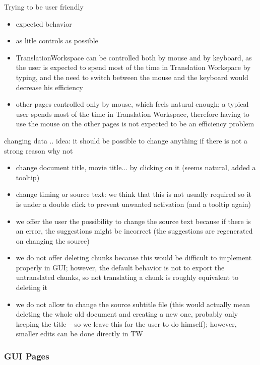 {Trying to be user friendly

\begin{itemize}
\item expected behavior
\item as litle controls as possible
\item TranslationWorkspace can be controlled both by mouse and by keyboard, as the user is expected to spend most of the time in Translation Workspace by typing, and the need to switch between the mouse and the keyboard would decrease his efficiency
\item other pages controlled only by mouse, which feels natural enough; a typical user spends most of the time in Translation Workspace, therefore having to use the mouse on the other pages is not expected to be an efficiency problem
\end{itemize}

changing data .. idea: it should be possible to change anything if there is not a strong reason why not
\begin{itemize}
\item change document title, movie title... by clicking on it (seems natural, added a tooltip)

\item change timing or source text: we think that this is not usually required so it is under a double click to prevent unwanted activation (and a tooltip again)

\item we offer the user the possibility to change the source text because if there is an error, the suggestions might be incorrect (the suggestions are regenerated on changing the source)

\item we do not offer deleting chunks because this would be difficult to implement properly in GUI; however, the default behavior is not to export the untranslated chunks, so not translating a chunk is roughly equivalent to deleting it

\item we do not allow to change the source subtitle file (this would actually mean deleting the whole old document and creating a new one, probably only keeping the title -- so we leave this for the user to do himself); however, smaller edits can be done directly in TW
\end{itemize}

\subsubsection{GUI Pages}

}
